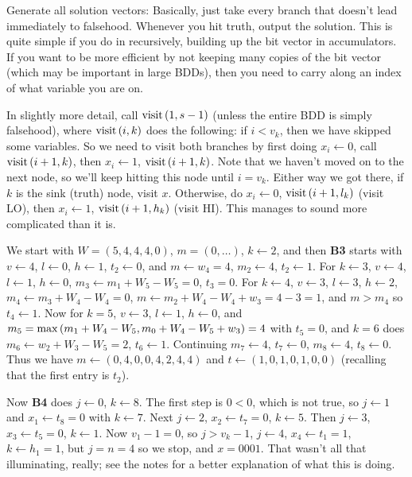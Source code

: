 \vskip 0.08in  Generate all solution vectors:
Basically, just take every branch that doesn't lead immediately to falsehood.
Whenever you hit truth, output the solution.  This is quite simple if you do in 
recursively, building up the bit vector in accumulators.  If you want to be more
efficient by not keeping many copies of the bit vector (which may be important
in large BDDs), then you need to carry along an index of what variable you
are on.

In slightly more detail, call ${\rm visit}\left(1, s-1\right)$ (unless the
entire BDD is simply falsehood), where ${\rm visit}\left(i, k\right)$ 
does the following: if $i < v_k$, then we have skipped some variables.
So we need to visit both branches by first doing $x_i \gets 0$,
call ${\rm visit}\left(i+1, k\right)$, then $x_i \gets 1$, ${\rm visit}
\left(i + 1, k\right)$.  Note that we haven't moved on to the next node,
so we'll keep hitting this node until $i = v_k$.  Either way we got there,
if $k$ is the sink (truth) node, visit $x$.  Otherwise, do 
$x_i \gets 0$, ${\rm visit}\left(i + 1, l_k\right)$ (visit LO),
then $x_i \gets 1$, ${\rm visit}\left(i + 1, h_k\right)$ (visit HI).
This manages to sound more complicated than it is.

\vskip 0.08in  We start with
$W = \left(5, 4, 4, 4, 0\right)$, $m = \left(0, \ldots\right)$,  $k \gets 2$,
and then {\bf B3} starts with
$v \gets 4$, $l \gets 0$, $h \gets 1$, $t_2 \gets 0$, and $m \gets w_4 = 4$,
$m_2 \gets 4$, $t_2 \gets 1$.  For $k \gets 3$, $v \gets 4$, $l \gets 1$,
$h \gets 0$, $m_3 \gets m_1 + W_5 - W_5 = 0$, $t_3 = 0$.
For $k \gets 4$, $v \gets 3$, $l \gets 3$, $h \gets 2$,
$m_4 \gets m_3 + W_4 - W_4 = 0$, $m \gets m_2 + W_4 - W_4 + w_3 = 
4 - 3 = 1$, and $m > m_4$ so $t_4 \gets 1$.   Now for $k = 5$,
$v \gets 3$, $l \gets 1$, $h \gets 0$, and $m_5 = 
{\rm max}\left(m_1 + W_4 - W_5, m_0 + W_4 - W_5 + w_3\right) = 
4$ with $t_5 = 0$, and $k=6$ does $m_6 \gets w_2 + W_3 - W_5 = 2$,
$t_6 \gets 1$.  Continuing $m_7 \gets 4$, $t_7 \gets 0$, $m_8 \gets 4$,
$t_8 \gets 0$.  Thus we have $m \gets \left(0, 4, 0, 0, 4, 2, 4, 4\right)$
and $t \gets \left(1, 0, 1, 0, 1, 0, 0\right)$ (recalling that the first entry
is $t_2$).

Now {\bf B4} does
$j \gets 0$, $k \gets 8$.  The first step is $0 < 0$, which is not true, so $j \gets 1$
and $x_1 \gets t_8 = 0$ with $k \gets 7$.  Next $j \gets 2$, $x_2 \gets t_7 = 0$,
$k \gets 5$.  Then $j \gets 3$, $x_3 \gets t_5 = 0$, $k \gets 1$.  Now $v_1 - 1 = 0$,
so $ j > v_k - 1$, $j \gets 4$, $x_4 \gets t_1 = 1$, $k \gets h_1 = 1$, but
$j = n = 4$ so we stop, and $x = 0001$.  That wasn't all that illuminating, really;
see the notes for a better explanation of what this is doing.

